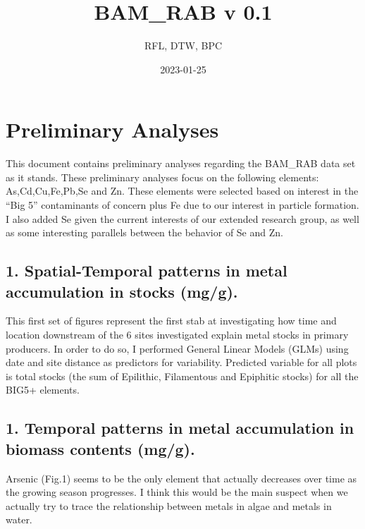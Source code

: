 \documentclass[
]{article}
\title{BAM\_RAB v 0.1}
\author{RFL, DTW, BPC}
\date{2023-01-25}
\begin{document}
\maketitle

\hypertarget{preliminary-analyses}{%
\section{Preliminary Analyses}\label{preliminary-analyses}}

This document contains preliminary analyses regarding the BAM\_RAB data
set as it stands. These preliminary analyses focus on the following
elements: As,Cd,Cu,Fe,Pb,Se and Zn. These elements were selected based
on interest in the ``Big 5'' contaminants of concern plus Fe due to our
interest in particle formation. I also added Se given the current
interests of our extended research group, as well as some interesting
parallels between the behavior of Se and Zn.

\hypertarget{spatial-temporal-patterns-in-metal-accumulation-in-stocks-mgg.}{%
\subsection{1. Spatial-Temporal patterns in metal accumulation in stocks
(mg/g).}\label{spatial-temporal-patterns-in-metal-accumulation-in-stocks-mgg.}}

This first set of figures represent the first stab at investigating how
time and location downstream of the 6 sites investigated explain metal
stocks in primary producers. In order to do so, I performed General
Linear Models (GLMs) using date and site distance as predictors for
variability. Predicted variable for all plots is total stocks (the sum
of Epilithic, Filamentous and Epiphitic stocks) for all the BIG5+
elements.

\hypertarget{temporal-patterns-in-metal-accumulation-in-biomass-contents-mgg.}{%
\subsection{1. Temporal patterns in metal accumulation in biomass
contents
(mg/g).}\label{temporal-patterns-in-metal-accumulation-in-biomass-contents-mgg.}}

Arsenic (Fig.1) seems to be the only element that actually decreases
over time as the growing season progresses. I think this would be the
main suspect when we actually try to trace the relationship between
metals in algae and metals in water.
\end{document}
